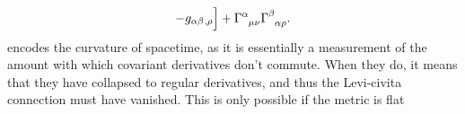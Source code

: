 \documentclass[
  letterpaper,
  DIV=11,
  numbers=noendperiod,
  oneside]{scrreprt}
\begin{document}
{\[{      -\texttip{\texttip{g}{metric tensor}_{\alpha \beta}}{covariant metric tensor component}\texttip{{}_{,\rho}}{Partial derivative} \Big]
  }+\mathtip{\Gamma^{\alpha}_{\phantom{\alpha}\mu\nu}}{\text{Levi-Civita Connection: }\Gamma^{\alpha}_{\phantom{\alpha}\mu\nu}=
  \frac{1}{2} \texttip{\texttip{g}{metric tensor}^{\alpha \rho}}{contravariant metric tensor component}
  \Big[
      \texttip{\texttip{g}{metric tensor}_{\rho \alpha}}{covariant metric tensor component}\texttip{{}_{,\mu}}{Partial derivative}
      +\texttip{\texttip{g}{metric tensor}_{\rho \mu}}{covariant metric tensor component}\texttip{{}_{,\alpha}}{Partial derivative}
      -\texttip{\texttip{g}{metric tensor}_{\mu \alpha}}{covariant metric tensor component}\texttip{{}_{,\rho}}{Partial derivative} \Big]
  }\mathtip{\Gamma^{\beta}_{\phantom{\beta}\alpha\rho}}{\text{Levi-Civita Connection: }\Gamma^{\beta}_{\phantom{\beta}\alpha\rho}=
  \frac{1}{2} \texttip{\texttip{g}{metric tensor}^{\beta \rho}}{contravariant metric tensor component}
  \Big[
      \texttip{\texttip{g}{metric tensor}_{\rho \beta}}{covariant metric tensor component}\texttip{{}_{,\alpha}}{Partial derivative}
      +\texttip{\texttip{g}{metric tensor}_{\rho \alpha}}{covariant metric tensor component}\texttip{{}_{,\beta}}{Partial derivative}
      -\texttip{\texttip{g}{metric tensor}_{\alpha \beta}}{covariant metric tensor component}\texttip{{}_{,\rho}}{Partial derivative} \Big]
  }.
  \]} encodes the curvature of spacetime, as it is essentially a
measurement of the amount with which covariant derivatives don't
commute. When they do, it means that they have collapsed to regular
derivatives, and thus the Levi-civita connection must have vanished. This is only possible if the metric is flat
\end{document}
